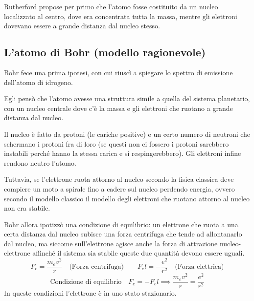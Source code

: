 Rutherford propose per primo che l'atomo fosse costituito da un nucleo localizzato al centro, dove era concentrata tutta la massa, mentre gli elettroni dovevano essere a grande distanza dal nucleo stesso.
\subsection{L'atomo di Bohr (modello ragionevole)}
Bohr fece una prima ipotesi, con cui riuscì a spiegare lo spettro di emissione dell'atomo di idrogeno.

Egli pensò che l'atomo avesse una struttura simile a quella del sistema planetario, con un nucleo centrale dove c'è la massa e gli elettroni che ruotano a grande distanza dal nucleo.

Il nucleo è fatto da protoni (le cariche positive) e un certo numero di neutroni che schermano i protoni fra di loro (se questi non ci fossero i protoni sarebbero instabili perché hanno la stessa carica e si respingerebbero). Gli elettroni infine rendono neutro l'atomo.

Tuttavia, se l'elettrone ruota attorno al nucleo secondo la fisica classica deve compiere un moto a spirale fino a cadere sul nucleo perdendo energia, ovvero secondo il modello classico il modello degli elettroni che ruotano attorno al nucleo non era stabile.

Bohr allora ipotizzò una condizione di equilibrio: un elettrone che ruota a una certa distanza dal nucleo subisce una forza centrifuga che tende ad allontanarlo dal nucleo, ma siccome sull'elettrone agisce anche la forza di attrazione nucleo-elettrone affinché il sistema sia stabile queste due quantità devono essere uguali.
$$F_c=\frac{m_ev^2}{r} \quad \text{(Forza centrifuga)} \qquad F_el=-\frac{e^2}{r^2} \quad \text{(Forza elettrica)}$$
$$\text{Condizione di equilibrio} \quad F_c=-F_el \implies \frac{m_ev^2}{r}=\frac{e^2}{r^2}$$
In queste condizioni l'elettrone è in uno stato stazionario.

